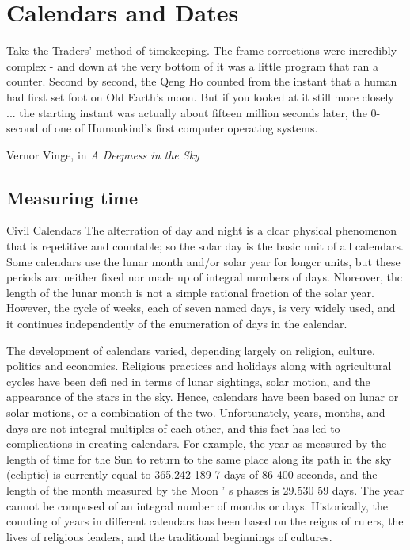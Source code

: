 \chapter{Calendars and Dates}

\epigraph{Take the Traders' method of timekeeping. The frame corrections were incredibly complex - and down at the very bottom of it was a little program that ran a counter. Second by second, the Qeng Ho counted from the instant that a human had first set foot on Old Earth's moon. But if you looked at it still more closely ... the starting instant was actually about fifteen million seconds later, the 0-second of one of Humankind's first computer operating systems.}{Vernor Vinge, in \textit{A Deepness in the Sky}}

\section{Measuring time}
Civil Calendars The alterration of day and night is a clcar physical phenomenon that is repetitive and countable; so the solar day is the basic unit of all
calendars. Some calendars use the lunar month and/or solar year for longcr units,
but these periods arc neither fixed nor made up of integral mrmbers of days. Nloreover,
thc length of thc lunar month is not a simple rational fraction of the solar
year. However, the cycle of weeks, each of seven namcd days, is very widely used,
and it continues independently of the enumeration of days in the calendar.

The development of calendars varied, depending largely on religion, culture, politics
and economics. Religious practices and holidays along with agricultural cycles
have been defi ned in terms of lunar sightings, solar motion, and the appearance
of the stars in the sky. Hence, calendars have been based on lunar or solar motions,
or a combination of the two. Unfortunately, years, months, and days are not integral
multiples of each other, and this fact has led to complications in creating
calendars. For example, the year as measured by the length of time for the Sun to
return to the same place along its path in the sky (ecliptic) is currently equal to
365.242 189 7 days of 86 400 seconds, and the length of the month measured by
the Moon ’ s phases is 29.530 59 days. The year cannot be composed of an integral
number of months or days. Historically, the counting of years in different calendars
has been based on the reigns of rulers, the lives of religious leaders, and the
traditional beginnings of cultures.

